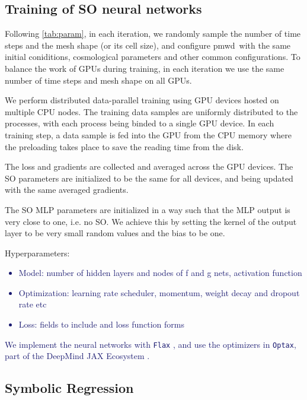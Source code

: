 \documentclass[modern, trackchanges, dvipsnames]{aastex631}
\newcommand{\pmwd}{{\usefont{T1}{nova}{m}{sl}pmwd}}
\newcommand{\YZ}[1]{\textcolor{MidnightBlue}{#1}}
\begin{document}
\vspace{1em}
\subsection{Training of SO neural networks}

Following \autoref{tab:param}, in each iteration, we randomly sample the number
of time steps and the mesh shape (or its cell size), and configure \pmwd\ with
the same initial coniditions, cosmological parameters and other common
configurations.
To balance the work of GPUs during training, in each iteration we use
the same number of time steps and mesh shape on all GPUs.

We perform distributed data-parallel training using GPU devices hosted on
multiple CPU nodes.
The training data samples are uniformly distributed to the processes, with
each process being binded to a single GPU device.
In each training step, a data sample is fed into the GPU from the CPU memory
where the preloading takes place to save the reading time from the disk.

The loss and gradients are collected and averaged across the GPU devices.
The SO parameters are initialized to be the same for all devices, and being
updated with the same averaged gradients.

The SO MLP parameters are initialized in a way such that the MLP output is very
close to one, i.e. no SO.
We achieve this by setting the kernel of the output layer to be very small
random values and the bias to be one.

Hyperparameters:
\YZ{
\begin{itemize}
  \item Model: number of hidden layers and nodes of f and g nets, activation function
  \item Optimization: learning rate scheduler, momentum, weight decay and dropout rate etc
  \item Loss: fields to include and loss function forms
\end{itemize}
}


\YZ{
We implement the neural networks with \texttt{Flax} \citep{flax2020github}, and
use the optimizers in \texttt{Optax}, part of the DeepMind JAX Ecosystem
\citep{deepmind2020jax}.
}


\vspace{1em}
\subsection{Symbolic Regression}
\end{document}
